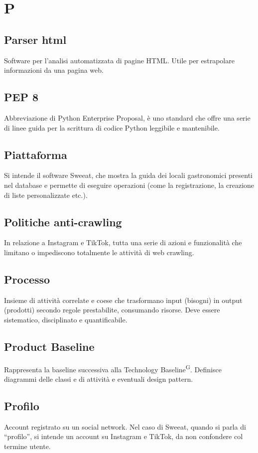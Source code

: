\section{P}

\subsection{Parser html}
Software per l'analisi automatizzata di pagine HTML. Utile per estrapolare informazioni da una pagina web.

\subsection{PEP 8}
Abbreviazione di Python Enterprise Proposal, è uno standard che offre una serie di linee guida per la scrittura di codice Python leggibile e mantenibile. 

\subsection{Piattaforma} Si intende il software Sweeat, che mostra la guida dei locali gastronomici presenti nel database e permette di eseguire operazioni (come la registrazione, la creazione di liste personalizzate etc.).

\subsection{Politiche anti-crawling}
In relazione a Instagram e TikTok, tutta una serie di azioni e funzionalità che limitano o impediscono totalmente le attività di web crawling.

\subsection{Processo}
Insieme di attività correlate e coese che trasformano input (bisogni) in output (prodotti) secondo regole prestabilite, consumando risorse. Deve essere sistematico, disciplinato e quantificabile.

\subsection{Product Baseline}
Rappresenta la baseline successiva alla Technology Baseline\textsuperscript{G}. Definisce diagrammi delle classi e di attività e eventuali design pattern. 

\subsection{Profilo} Account registrato su un social network. Nel caso di Sweeat, quando si parla di “profilo”, si intende un account su Instagram e TikTok, da non confondere col termine utente.


